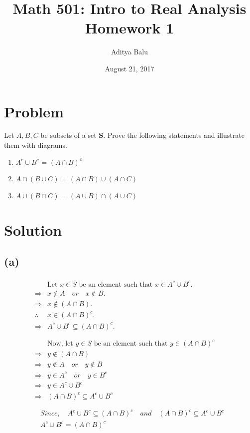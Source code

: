 \documentclass[]{article}
\title{Math 501: Intro to Real Analysis\\Homework 1}
\date{August 21, 2017}
\author{Aditya Balu}
\begin{document}
\maketitle

\section* {Problem}

Let $A, B, C$ be subsets of a set $\mathbf{S}$. Prove the following statements and illustrate them with diagrams.
\begin{enumerate}[label=\alph*]
	\item  $A^c \cup B^c$ = $(A \cap B)^c$
	\item  $A \cap (B \cup C)$ = $(A \cap B)\cup(A \cap C)$
	\item  $A \cup (B \cap C)$ = $(A \cup B)\cap(A \cup C)$
\end{enumerate}

\section* {Solution}
\subsection*{(a)}

\begin{align*}
	\begin{split}
		&\text{Let $x \in S$ be an element such that $x \in A^c \cup B^c$.}\\
		\Rightarrow& x \notin A \quad or \quad x \notin B. \\
		\Rightarrow& x \notin (A \cap B).\\
		\therefore& x\in (A \cap B)^c.\\
		\Rightarrow& A^c \cup B^c \subseteq (A\cap B)^c.\\
	\end{split}\\
	\begin{split}
		&\text{Now, let  $y \in S$ be an element such that $y \in (A\cap B)^c$}\\
		\Rightarrow& y \notin (A\cap B)\\
		\Rightarrow& y \notin A \quad or \quad y \notin B\\
		\Rightarrow& y \in A^c \quad or \quad y \in B^c\\
		\Rightarrow& y \in A^c \cup B^c\\
		\Rightarrow& (A \cap B)^c \subseteq A^c \cup B^c \\
	\end{split}\\
	\begin{split}
		&Since,\quad A^c \cup B^c \subseteq (A\cap B)^c \quad and \quad (A \cap B)^c \subseteq A^c \cup B^c\\
		&A^c \cup B^c = (A\cap B)^c
	\end{split}	
\end{align*}
\end{document}
